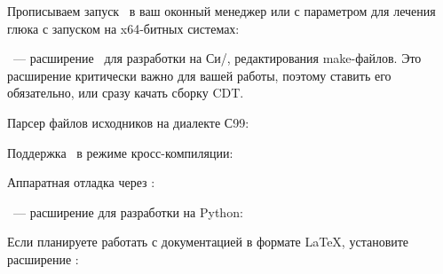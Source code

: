 Прописываем запуск \eclipse\ в ваш оконный менеджер или 
с параметром  для лечения глюка с запуском на x64-битных
системах:



\href{https://eclipse.org/cdt/}{}\ --- расширение \eclipse\ для
разработки на Си/\cpp, редактирования make-файлов. Это расширение критически
важно для вашей работы, поэтому ставить его обязательно, или сразу качать сборку
CDT\eclipse.
\bigskip









Парсер файлов исходников на диалекте С99:

Поддержка \ в режиме кросс-компиляции:

Аппаратная отладка через :



\href{http://pydev.org/}{}\ --- расширение для разработки на Python:
\bigskip










Если планируете работать с документацией в формате \LaTeX, установите расширение
\href{http://texlipse.sourceforge.net/}{}:
\bigskip


